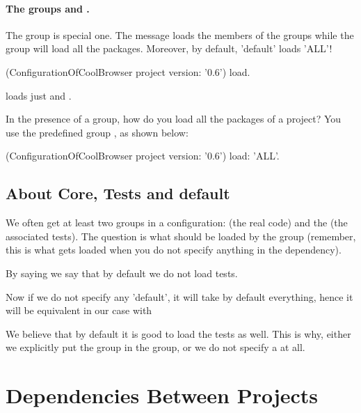 \documentclass[a4paper,10pt,twoside]{book}
\begin{document}
\paragraph{The groups  and .} 
The  group is special one.  The  message loads the members of the  groups while the group  
will load all the packages. Moreover, by default, 'default' loads 'ALL'!

    
\begin{code}{}
(ConfigurationOfCoolBrowser project version: '0.6') load.
\end{code}

\noindent
loads just  and .

In the presence of a  group, how do you load all the packages of a project?  You use the predefined group  , as shown below: 

\begin{code}{}
(ConfigurationOfCoolBrowser project version: '0.6') load: 'ALL'.
\end{code}
 
\subsection{About Core, Tests and default}

We often get at least two groups in a configuration:  (the real code) and the  (the associated tests).  The question is what should be loaded by the  group (remember, this is what gets loaded when you do not specify anything in the dependency).

By saying  we say that by default we do not load tests. 

Now if we do not specify any 'default', it will take by default everything, hence it will be equivalent in our case with 

We believe that by default it is good to load the tests as well. This is why, either we explicitly put the  group in the  group, or we do not specify a  at all.



\section{Dependencies Between Projects}
\end{document}
